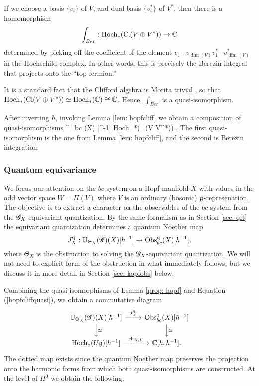 If we choose a basis $\{v_i\}$ of $V$, and dual basis $\{v_i^*\}$ of $V^*$, then there is a homomorphism 
\[
\int_{Ber} : {\rm Hoch}_* ({\rm Cl} (V \oplus V^*)) \to \mathbb C 
\]
determined by picking off the coefficient of the element $v_1 \cdots v_{\dim(V)} v_1^* \cdots v^*_{\dim(V)}$ in the Hochschild complex. 
In other words, this is precisely the Berezin integral that projects onto the ``top fermion.'' 

It is a standard fact that the Clifford algebra is Morita trivial , so that ${\rm Hoch}_*({\rm Cl}(V \oplus V^*)) \simeq {\rm Hoch}_* (\mathbb C) \cong \mathbb C$.
Hence, $\int_{Ber}$ is a quasi-isomorphism. 

After inverting $\hbar$, invoking Lemma \ref{lem: hopfcliff} we obtain a composition of quasi-isomorphisms 
\beqn\label{hopfcliffquasi}
\Obs^\q_{bc} (X) [\hbar^{-1}] \xto{\simeq} {\rm Hoch}_*(\Cl_\hbar (V \oplus V^*)) \xto{\simeq} .
\eeqn
The first quasi-isomorphism is the one from Lemma \ref{lem: hopfcliff}, and the second is Berezin integration. 

\subsubsection{Quantum equivariance}

We focus our attention on the $bc$ system on a Hopf manifold $X$ with values in the odd vector space $W = \Pi(V)$ where $V$ is an ordinary (bosonic) $\mathfrak g$-represenation. 
The objective is to extract a character on the observables of the $bc$ system from the $\mathscr G_X$-equivariant quantization. 
By the same formalism as in Section \ref{sec: qft} the equivariant quantization determines a quantum Noether map
\[
J_X^{\rm q} : \mathbb U_{\Theta_X} (\mathscr G)(X) [\hbar^{-1}]  \to {\rm Obs}^{\rm q}_{bc}(X) [\hbar^{-1}] ,
\]
where $\Theta_X$ is the obstruction to solving the $\mathscr G_X$-equivariant quantization. 
We will not need to explicit form of the obstruction in what immediately follows, but we discuss it in more detail in Section \ref{sec: hopfobs} below. 

Combining the quasi-isomorphisms of Lemma \ref{prop: hopf} and Equation (\ref{hopfcliffquasi}), we obtain a commutative diagram
\[
\begin{tikzcd}
\UU_{\Theta_X} (\sG)(X) [\hbar^{-1}]  \ar[r, "J_X^\q"] \ar[d, "\simeq"] & \Obs^\q_{bc}(X) [\hbar^{-1}] \ar[d, "\simeq"] \\
\Hoch_*(U \fg) [\hbar^{-1}] \ar[r,dotted,"{\rm ch}_{X,V}"] & \CC[\hbar,\hbar^{-1}] .
\end{tikzcd}
\] 
The dotted map exists since the quantum Noether map preserves the projection onto the harmonic forms from which both quasi-isomorphisms are constructed.
At the level of $H^0$ we obtain the following.

